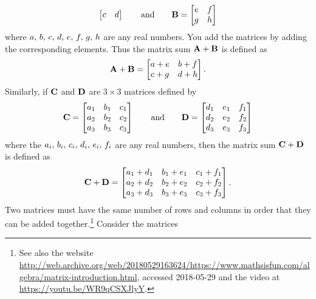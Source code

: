 \documentclass[a4paper,oneside,12pt]{article}
\begin{document}
\begin{problem}
\begin{packedenum}
\begin{equation}
\begin{bmatrix}
    c & d
    \end{bmatrix}
    \qquad
    \text{and}
    \qquad
    \textbf{B}
    =
    \begin{bmatrix}
    e & f \\
    g & h
    \end{bmatrix}
    \end{equation}
    where ${a},\, {b},\, {c},\, {d},\, {e},\, {f},\, {g},\, {h}$ are any real numbers.
    You add the matrices by adding the corresponding elements.  Thus
    the matrix sum $\textbf{A} + \textbf{B}$ is defined as
    \[
    \textbf{A} + \textbf{B}
    =
    \begin{bmatrix}
    a + e & b + f \\
    c + g & d + h
    \end{bmatrix}.
    \]
    Similarly, if $\textbf{C}$ and $\textbf{D}$ are $3 \times 3$ matrices
    defined by
    \begin{equation}
    \label{eqn:quadratic_applications:3x3_matrices}
    \textbf{C}
    =
    \begin{bmatrix}
    a_1 & b_1 & c_1 \\
    a_2 & b_2 & c_2 \\
    a_3 & b_3 & c_3
    \end{bmatrix}
    \qquad
    \text{and}
    \qquad
    \textbf{D}
    =
    \begin{bmatrix}
    d_1 & e_1 & f_1 \\
    d_2 & e_2 & f_2 \\
    d_3 & e_3 & f_3
    \end{bmatrix}
    \end{equation}
    where the ${a_i},\, {b_i},\, {c_i},\, {d_i},\, {e_i},\, {f_i}$ are any real
    numbers, then the matrix sum $\textbf{C} + \textbf{D}$ is defined as
    \[
    \textbf{C} + \textbf{D}
    =
    \begin{bmatrix}
    a_1 + d_1 & b_1 + e_1 & c_1 + f_1 \\
    a_2 + d_2 & b_2 + e_2 & c_2 + f_2 \\
    a_3 + d_3 & b_3 + e_3 & c_3 + f_3
    \end{bmatrix}.
    \]
    Two matrices must have the same number of rows and columns in
    order that they can be added together.\footnote{
      See also the website
      \url{http://web.archive.org/web/20180529163624/https://www.mathsisfun.com/algebra/matrix-introduction.html},
      accessed 2018-05-29 and the video at
      \url{https://youtu.be/WR9qCSXJlyY}.
    }
    Consider the matrices
    \begin{equation}

\end{equation}
\end{packedenum}
\end{problem}
\end{document}
